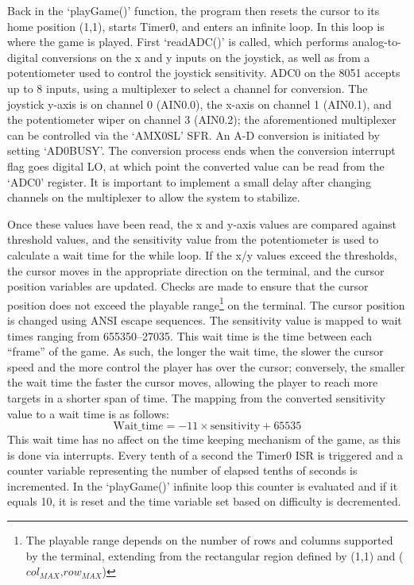 \documentclass[12pt]{article}
\begin{document}
Back in the `playGame()' function, the program then resets the cursor to its home position (1,1), starts Timer0, and enters an infinite loop. In this loop is where the game is played. First `readADC()' is called, which performs analog-to-digital conversions on the x and y inputs on the joystick, as well as from a potentiometer used to control the joystick sensitivity. ADC0 on the 8051 accepts up to 8 inputs, using a multiplexer to select a channel for conversion. The joystick y-axis is on channel 0 (AIN0.0), the x-axis on channel 1 (AIN0.1), and the potentiometer wiper on channel 3 (AIN0.2); the aforementioned multiplexer can be controlled via the `AMX0SL' SFR. An A-D conversion is initiated by setting `AD0BUSY'. The conversion process ends when the conversion interrupt flag goes digital LO, at which point the converted value can be read from the `ADC0' register. It is important to implement a small delay after changing channels on the multiplexer to allow the system to stabilize. 

Once these values have been read, the x and y-axis values are compared against threshold values, and the sensitivity value from the potentiometer is used to calculate a wait time for the while loop. If the x/y values exceed the thresholds, the cursor moves in the appropriate direction on the terminal, and the cursor position variables are updated. Checks are made to ensure that the cursor position does not exceed the playable range\footnote{The playable range depends on the number of rows and columns supported by the terminal, extending from the rectangular region defined by (1,1) and ($col_{MAX}$,$row_{MAX}$)} on the terminal. The cursor position is changed using ANSI escape sequences. The sensitivity value is mapped to wait times ranging from 655350--27035. This wait time is the time between each ``frame'' of the game. As such, the longer the wait time, the slower the cursor speed and the more control the player has over the cursor; conversely, the smaller the wait time the faster the cursor moves, allowing the player to reach more targets in a shorter span of time. The mapping from the converted sensitivity value to a wait time is as follows: 
\begin{displaymath}
	\mathrm{Wait\_tim}e=-11\times \mathrm{sensitivity}+65535
\end{displaymath}
This wait time has no affect on the time keeping mechanism of the game, as this is done via interrupts. Every tenth of a second the Timer0 ISR is triggered and a counter variable representing the number of elapsed tenths of seconds is incremented. In the `playGame()' infinite loop this counter is evaluated and if it equals 10, it is reset and the time variable set based on difficulty is decremented. 
\end{document}
